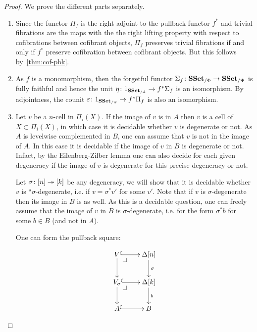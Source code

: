 \documentclass[reqno,10pt,a4paper,oneside,draft]{amsart}
\begin{document}
 
\begin{proof} We prove the different parts separately. 
\begin{enumerate}[$(i)$] 
\item 

Since the functor $\Pi_f$ is the right adjoint to the pullback functor $f^*$ and trivial fibrations are the maps with the the right lifting property with respect to cofibrations between cofibrant objects, $\Pi_f$ preserves trivial fibrations if and only if $f^*$ preserve cofibration between cofibrant objects. But this follows by~\cref{thm:cof-pbk}.

\item As $f$ is a monomorphism, then the forgetful functor $\Sigma_{f} \colon \mathbf{SSet}_{/\Phi} \rightarrow \mathbf{SSet}_{/\Psi}$ is fully faithful and hence the unit $\eta \colon 1_{\mathbf{SSet}_{/A}} \rightarrow f^* \Sigma_{f}$ is an isomorphism. By adjointness, the counit $\varepsilon \colon 1_{\mathbf{SSet}_{/\Psi}} \rightarrow f^* \Pi_f$ is also an isomorphism.

\item Let $v$ be a $n$-cell in $\Pi_i(X)$.
If the image of $v$ is in $A$ then $v$ is a cell of $X \subset \Pi_i(X)$, in which case it is decidable whether $v$ is degenerate or not.
As $A$ is levelwise complemented in $B$, one can assume that $v$ is not in the image of $A$. In this case it is decidable if the image of $v$ in $B$ is degenerate or not.
Infact, by the Eilenberg-Zilber lemma one can also decide for each given degeneracy if the image of $v$ is degenerate for this precise degeneracy or not. 

Let $\sigma \colon [n] \twoheadrightarrow [k]$ be any degeneracy, we will show that it is decidable whether $v$ is ``$\sigma$-degenerate, i.e. if $v =\sigma^* v'$ for some $v'$. Note that if $v$ is $\sigma$-degenerate then its image in $B$ is as well. As this is a decidable question, one can freely assume that the image of $v$ in $B$ is $\sigma$-degenerate, i.e. for the form $\sigma^* b$ for some $b \in B$ (and not in $A$).

 One can form the pullback square:


\[
\xymatrix{
V \ar@{^{(}->}[r] \drpullback \ar[d] & \Delta[n] \ar@{->}[d]^{\sigma} \\
V_{\sigma} \ar@{^{(}->}[r] \drpullback \ar[d] & \Delta[k] \ar@{->}[d]^b \\
A \ar@{^{(}->}[r] &  B }
\]


\end{enumerate}
\end{proof}
\end{document}
